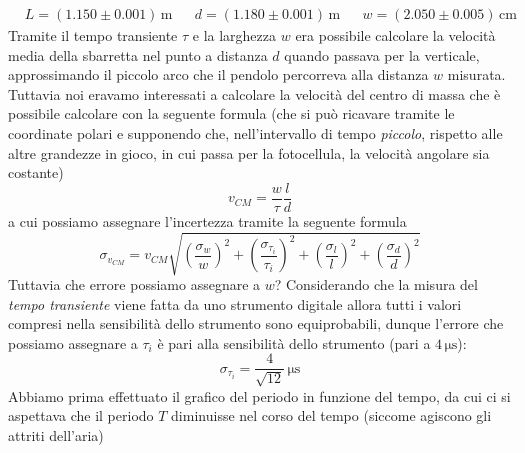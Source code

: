 \documentclass{article}
\begin{document}
\begin{align*}
	&L = (1.150 \pm 0.001) \, \si{\meter} & &d = (1.180 \pm 0.001) \, \si{\meter} & &w = (2.050 \pm 0.005) \, \si{\centi\meter}
\end{align*}
Tramite il tempo transiente $\tau$ e la larghezza $w$ era possibile calcolare la velocità media della sbarretta nel punto a distanza $d$ quando passava per la verticale, approssimando il piccolo arco che il pendolo percorreva alla distanza $w$ misurata. Tuttavia noi eravamo interessati a calcolare la velocità del centro di massa che è possibile calcolare con la seguente formula (che si può ricavare tramite le coordinate polari e supponendo che, nell'intervallo di tempo \emph{piccolo}, rispetto alle altre grandezze in gioco, in cui passa per la fotocellula, la velocità angolare sia costante)
\begin{equation}
	v_{CM} = \frac{w}{\tau}\frac{l}{d}
\end{equation}
a cui possiamo assegnare l'incertezza tramite la seguente formula
\begin{equation}
	\sigma_{v_{CM}} = v_{CM} \sqrt{ \left( \frac{\sigma_w}{w} \right)^2 + \left( \frac{\sigma_{\tau_i}}{\tau_i} \right)^2 + \left( \frac{\sigma_l}{l} \right)^2 + \left( \frac{\sigma_d}{d} \right)^2}
\end{equation}
Tuttavia che errore possiamo assegnare a $w$? Considerando che la misura del \emph{tempo transiente} viene fatta da uno strumento digitale allora tutti i valori compresi nella sensibilità dello strumento sono equiprobabili, dunque l'errore che possiamo assegnare a $\tau_i$ è pari alla sensibilità dello strumento (pari a $4 \, \si{\micro\second}$):
$$
	\sigma_{\tau_i} = \frac{4}{\sqrt{12}} \, \si{\micro\second}
$$
Abbiamo prima effettuato il grafico del periodo in funzione del tempo, da cui ci si aspettava che il periodo $T$ diminuisse nel corso del tempo (siccome agiscono gli attriti dell'aria)
\end{document}
